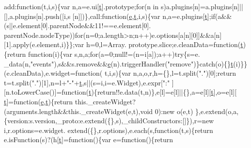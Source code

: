 \begin{DoxyCode}
      add:\textcolor{keyword}{function}(t,i,s)\{var n,a=e.ui[\hyperlink{jquery-2_80_83_8min_8js_aaccc9105df5383111407fd5b41255e23}{t}].prototype;\textcolor{keywordflow}{for}(n in s)a.plugins[n]=a.plugins[n]||[],a.plugins[n].push([i,s
      [n]])\},call:\textcolor{keyword}{function}(\hyperlink{jquery-ui_8min_8js_a2c038346d47955cbe2cb91e338edd7e1}{e},\hyperlink{jquery-2_80_83_8min_8js_aaccc9105df5383111407fd5b41255e23}{t},i,s)\{var n,a=e.plugins[\hyperlink{jquery-2_80_83_8min_8js_aaccc9105df5383111407fd5b41255e23}{t}];\textcolor{keywordflow}{if}(a&&(s||e.element[0].parentNode&&11!==e.element[0].
      parentNode.nodeType))\textcolor{keywordflow}{for}(n=0;a.length>n;n++)e.options[a[n][0]]&&a[n][1].apply(e.element,i)\}\};var h=0,l=Array.
      prototype.slice;e.cleanData=\textcolor{keyword}{function}(\hyperlink{jquery-2_80_83_8min_8js_aaccc9105df5383111407fd5b41255e23}{t})\{\textcolor{keywordflow}{return} \textcolor{keyword}{function}(i)\{var s,n,a;\textcolor{keywordflow}{for}(a=0;null!=(n=i[a]);a++)\textcolor{keywordflow}{try}\{s=e.
      \_data(n,\textcolor{stringliteral}{"events"}),s&&s.remove&&\hyperlink{jquery-ui_8min_8js_a2c038346d47955cbe2cb91e338edd7e1}{e}(n).triggerHandler(\textcolor{stringliteral}{"remove"})\}\textcolor{keywordflow}{catch}(o)\{\}\hyperlink{jquery-2_80_83_8min_8js_aaccc9105df5383111407fd5b41255e23}{t}(i)\}\}(e.cleanData),e.widget=\textcolor{keyword}{function}(
      t,i,s)\{var n,a,o,r,h=\{\},l=t.split(\textcolor{stringliteral}{"."})[0];\textcolor{keywordflow}{return} t=t.split(\textcolor{stringliteral}{"."})[1],n=l+\textcolor{stringliteral}{"-"}+\hyperlink{jquery-2_80_83_8min_8js_aaccc9105df5383111407fd5b41255e23}{t},s||(s=i,i=e.Widget),e.expr[\textcolor{stringliteral}{":"}
      ][n.toLowerCase()]=\textcolor{keyword}{function}(\hyperlink{jquery-2_80_83_8min_8js_aaccc9105df5383111407fd5b41255e23}{t})\{\textcolor{keywordflow}{return}!!e.data(t,n)\},e[l]=e[l]||\{\},a=e[l][\hyperlink{jquery-2_80_83_8min_8js_aaccc9105df5383111407fd5b41255e23}{t}],o=e[l][
      \hyperlink{jquery-2_80_83_8min_8js_aaccc9105df5383111407fd5b41255e23}{t}]=\textcolor{keyword}{function}(\hyperlink{jquery-ui_8min_8js_a2c038346d47955cbe2cb91e338edd7e1}{e},\hyperlink{jquery-2_80_83_8min_8js_aaccc9105df5383111407fd5b41255e23}{t})\{\textcolor{keywordflow}{return} this.\_createWidget?(arguments.length&&this.\_createWidget(e,t),\textcolor{keywordtype}{void} 0):\textcolor{keyword}{new} o(e,t)
      \},e.extend(o,a,\{version:s.version,\_proto:e.extend(\{\},s),\_childConstructors:[]\}),r=\textcolor{keyword}{new} i,r.options=e.widget.
      extend(\{\},r.options),e.each(s,\textcolor{keyword}{function}(t,s)\{\textcolor{keywordflow}{return} e.isFunction(s)?(h[\hyperlink{jquery-2_80_83_8min_8js_aaccc9105df5383111407fd5b41255e23}{t}]=\textcolor{keyword}{function}()\{var e=\textcolor{keyword}{function}()\{\textcolor{keywordflow}{return} 

\end{DoxyCode}
